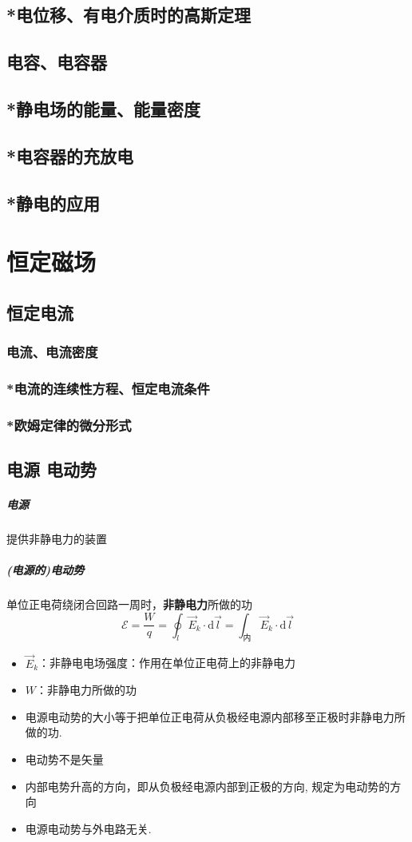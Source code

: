 \documentclass[UTF8,a4paper,12pt,scheme=chinese]{ctexbook}
\newcommand{\sll}[1]{\overrightarrow{#1}}
\newcommand{\ud}{\mathrm{d}}
\begin{document}
	\section{*电位移、有电介质时的高斯定理}
	\section{电容、电容器}
	\section{*静电场的能量、能量密度}
	\section{*电容器的充放电}
	\section{*静电的应用}
	\chapter{恒定磁场}
	\section{恒定电流}
	\subsection{电流、电流密度}
	\subsection{*电流的连续性方程、恒定电流条件}
	\subsection{*欧姆定律的微分形式}
	\section{电源 电动势}
	\paragraph{电源}提供非静电力的装置
	\paragraph{(电源的)电动势}单位正电荷绕闭合回路一周时，\textbf{非静电力}所做的功
	$$ \mathscr{E}=\dfrac{W}{q}=\oint_l\sll{E}_k\cdot\ud\sll{l}=\int_{\mbox{内}} \sll{E}_k\cdot\ud\sll{l} $$
	\begin{itemize}
		\item $ \sll{E}_k $：非静电电场强度：作用在单位正电荷上的非静电力
		\item $ W $：非静电力所做的功
		\item 电源电动势的大小等于把单位正电荷从负极经电源内部移至正极时非静电力所做的功.
		\item 电动势不是矢量
		\item 内部电势升高的方向，即从负极经电源内部到正极的方向, 
		规定为电动势的方向
		\item 电源电动势与外电路无关.
	\end{itemize}
\end{document}
